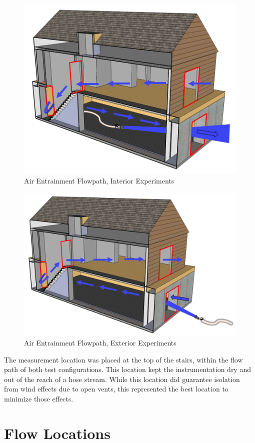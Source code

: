 \documentclass[12pt,oneside]{book}
\begin{document}
\begin{figure}[!ht]
	\centering
	\includegraphics[width=.7\columnwidth]{Figures/Air_Entrainment/Airflow_Layout}
	\caption{Air Entrainment Flowpath, Interior Experiments}
	\label{fig:Air_Entrainment_Flowpath_Interior_Experiments}
\end{figure}

\begin{figure}[!ht]
	\centering
	\includegraphics[width=.7\columnwidth]{Figures/Air_Entrainment/Airflow_Layout_Ext}
	\caption{Air Entrainment Flowpath, Exterior Experiments}
	\label{fig:Air_Entrainment_Flowpath_Exterior_Experiments}
\end{figure}

The measurement location was placed at the top of the stairs, within the flow path of both test configurations. This location kept the instrumentation dry and out of the reach of a hose stream. While this location did guarantee isolation from wind effects due to open vents, this represented the best location to minimize those effects.

\clearpage

\section{Flow Locations}
\end{document}
